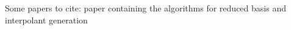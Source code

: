 Some papers to cite: paper containing the algorithms for reduced basis and interpolant generation \cite{Field_2014}
